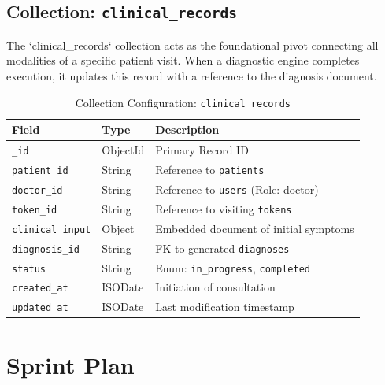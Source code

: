 \documentclass[a4paper,12pt]{report}
\begin{document}
\subsection{Collection: \texttt{clinical\_records}}

The `clinical\_records` collection acts as the foundational pivot connecting all modalities of a specific patient visit. When a diagnostic engine completes execution, it updates this record with a reference to the diagnosis document.

\begin{table}[H]
\centering
\caption{Collection Configuration: \texttt{clinical\_records}}
\vspace{6pt}
\renewcommand{\arraystretch}{1.3}
\begin{tabular}{|l|l|p{7.5cm}|}
\hline
\textbf{Field}           & \textbf{Type}  & \textbf{Description} \\
\hline
\texttt{\_id}            & ObjectId       & Primary Record ID \\
\texttt{patient\_id}     & String         & Reference to \texttt{patients} \\
\texttt{doctor\_id}      & String         & Reference to \texttt{users} (Role: doctor) \\
\texttt{token\_id}       & String         & Reference to visiting \texttt{tokens} \\
\texttt{clinical\_input} & Object         & Embedded document of initial symptoms\\
\texttt{diagnosis\_id}   & String         & FK to generated \texttt{diagnoses} \\
\texttt{status}          & String         & Enum: \texttt{in\_progress}, \texttt{completed} \\
\texttt{created\_at}     & ISODate        & Initiation of consultation \\
\texttt{updated\_at}     & ISODate        & Last modification timestamp \\
\hline
\end{tabular}
\label{tab:col_clinical}
\end{table}


\section{Sprint Plan}
\end{document}
